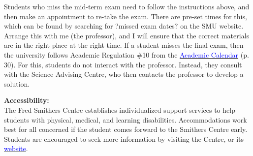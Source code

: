 \documentclass[hidelinks]{article}
\begin{document}
	Students who miss the mid-term exam need to follow the instructions above, and then make an appointment to re-take the exam. There are pre-set times for this, which can be found by searching for ?missed exam dates? on the SMU website. Arrange this with me (the professor), and I will ensure that the correct materials are in the right place at the right time. If a student misses the final exam, then the university follows Academic Regulation \#10 from the \href{https://smu.ca/webfiles/AcademicCalendar2019-2020Undergraduate(PDF).pdf}{\textcolor{blue}{Academic Calendar}} (p. 30). For this, students do not interact with the professor. Instead, they consult with the Science Advising Centre, who then contacts the professor to develop a solution.


	\vspace{0.3cm}
	
	\textbf{Accessibility:}\\
	The Fred Smithers Centre establishes individualized support services to help students with physical, medical, and learning disabilities. Accommodations work best for all concerned if the student comes forward to the Smithers Centre early.  Students are encouraged to seek more information by visiting the Centre, or its \href{http://www.smu.ca/campus-life/fred-smithers-centre.html}{\textcolor{blue}{website}}.	 
\end{document}
